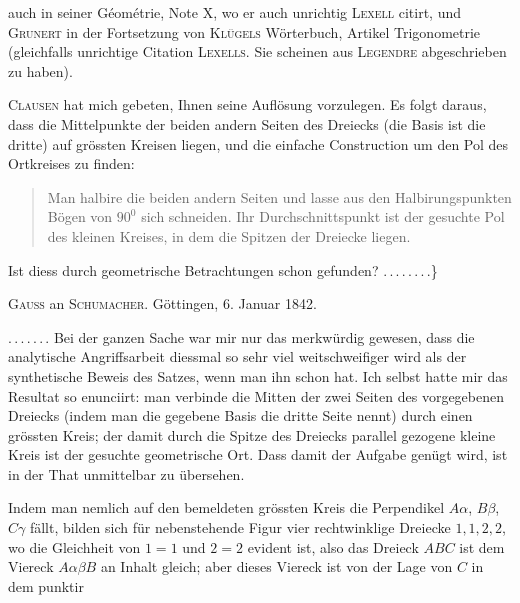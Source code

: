 auch in seiner Géométrie, Note X, wo er auch unrichtig \textsc{Lexell} citirt, und \textsc{Grunert} in der Fortsetzung von \textsc{Klügels} Wörterbuch, Artikel Trigonometrie (gleichfalls unrichtige Citation \textsc{Lexells}. Sie scheinen aus \textsc{Legendre} abgeschrieben zu haben).

\textsc{Clausen} hat mich gebeten, Ihnen seine Auflösung vorzulegen. Es folgt daraus, dass die Mittelpunkte der beiden andern Seiten des Dreiecks (die Basis ist die dritte) auf grössten Kreisen liegen, und die einfache Construction um den Pol des Ortkreises zu finden:

\begin{quote}
Man halbire die beiden andern Seiten und lasse aus den Halbirungspunkten Bögen von $90^0$ sich schneiden. Ihr Durchschnittspunkt ist der gesuchte Pol des kleinen Kreises, in dem die Spitzen der Dreiecke liegen.
\end{quote}

Ist diess durch geometrische Betrachtungen schon gefunden? \mbox{.\,.\,.\,.\,.\,.\,.\,.}\}

\medskip

\begin{center}
\textsc{Gauss} an \textsc{Schumacher}. Göttingen, 6. Januar 1842.
\end{center}

\mbox{.\,.\,.\,.\,.\,.\,.} Bei der ganzen Sache war mir nur das merkwürdig gewesen, dass die analytische Angriffsarbeit diessmal so sehr viel weitschweifiger wird als der synthetische Beweis des Satzes, wenn man ihn schon hat. Ich selbst hatte mir das Resultat so enunciirt: man verbinde die Mitten der zwei Seiten des vorgegebenen Dreiecks (indem man die gegebene Basis die dritte Seite nennt) durch einen grössten Kreis; der damit durch die Spitze des Dreiecks parallel gezogene kleine Kreis ist der gesuchte geometrische Ort. Dass damit der Aufgabe genügt wird, ist in der That unmittelbar zu übersehen.

\begin{center}\end{center}

Indem man nemlich auf den bemeldeten grössten Kreis die Perpendikel $A\alpha$, $B\beta$, $C\gamma$ fällt, bilden sich für nebenstehende Figur vier rechtwinklige Dreiecke $1,1,2,2$, wo die Gleichheit von $1=1$ und $2=2$ evident ist, also das Dreieck $ABC$ ist dem Viereck $A\alpha\beta B$ an Inhalt gleich; aber dieses Viereck ist von der Lage von $C$ in dem punktir%
